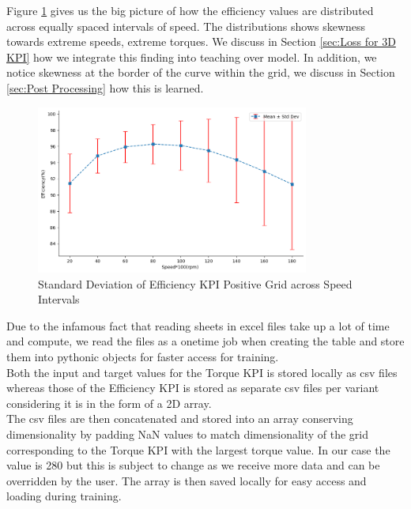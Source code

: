 \documentclass{report} %
\begin{document}
Figure \ref{fig:Standard Deviation of 3D KPI(Efficiency) Positive Grid across Speed Intervals} gives us the big picture of how the efficiency values are distributed across equally spaced intervals of speed.
The distributions shows skewness towards extreme speeds, extreme torques. We discuss in Section \ref{sec:Loss for 3D KPI} how we integrate this finding into teaching over model.
In addition, we notice skewness at the border of the curve within the grid, we discuss in Section \ref{sec:Post Processing} how this is learned.
\begin{figure}[H]
    \centering
    \includegraphics[width=0.8\textwidth]{./ReportImages/stddev_y2_nn_Target.png} 
    \caption{Standard Deviation of Efficiency \ac{KPI} Positive Grid across Speed Intervals} 
    \label{fig:Standard Deviation of 3D KPI(Efficiency) Positive Grid across Speed Intervals}
\end{figure}

Due to the infamous fact that reading sheets in excel files take up a lot of time and compute, we read the files as a onetime job when creating the table and store them into pythonic objects for faster access for training.\\
Both the input and target values for the Torque \ac{KPI} is stored locally as csv files whereas those of the Efficiency \ac{KPI} is stored as separate csv files per variant considering it is in the form of a \ac{2D} array.\\
The csv files are then concatenated and stored into an array conserving dimensionality by padding \ac{NaN} values to match dimensionality of the grid corresponding to the Torque \ac{KPI} with the largest torque value.
In our case the value is 280 but this is subject to change as we receive more data and can be overridden by the user.
The array is then saved locally for easy access and loading during training.\\
\end{document}
